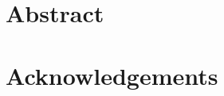 \documentclass[a4paper,11pt, openany]{book} %
\begin{document}
\renewcommand\cite{\citep}

\thispagestyle{empty}

\maketitlepage

\statementpage

\chapter*{Abstract}


\newpage

\chapter*{Acknowledgements}



\tableofcontents


\clearpage
{}

















\appendix




\renewcommand{\emph}{\textit}



\end{document}
